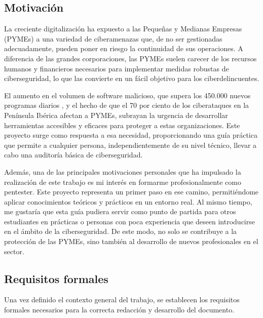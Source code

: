 \documentclass[a4paper, 10pt]{article}
\begin{document}
\subsection{Motivación}
La creciente digitalización ha expuesto a las Pequeñas y Medianas Empresas (PYMEs) a una variedad de ciberamenazas que, de no ser gestionadas adecuadamente, 
pueden poner en riesgo la continuidad de sus operaciones. A diferencia de las grandes corporaciones, las PYMEs suelen carecer de los recursos humanos y financieros 
necesarios para implementar medidas robustas de ciberseguridad, lo que las convierte en un fácil objetivo para los ciberdelincuentes.
\par\vspace{0.5cm}
El aumento en el volumen de software malicioso, que supera los 450.000 nuevos programas diarios \cite{avtest}, y el hecho de que el 70 
por ciento de los ciberataques en la Península Ibérica afectan a PYMEs, subrayan la urgencia de desarrollar herramientas accesibles y eficaces para proteger a estas organizaciones. 
Este proyecto surge como respuesta a esa necesidad, proporcionando una guía práctica que permite a cualquier persona, independientemente de su nivel técnico, llevar a cabo una auditoría 
básica de ciberseguridad.
\par\vspace{0.5cm}
Además, una de las principales motivaciones personales que ha impulsado la realización de este trabajo es mi interés en formarme profesionalmente como pentester. 
Este proyecto representa un primer paso en ese camino, permitiéndome aplicar conocimientos teóricos y prácticos en un entorno real. Al mismo tiempo, me gustaría que esta guía 
pudiera servir como punto de partida para otros estudiantes en prácticas o personas con poca experiencia que deseen introducirse en el ámbito de la ciberseguridad. 
De este modo, no solo se contribuye a la protección de las PYMEs, sino también al desarrollo de nuevos profesionales en el sector.
\par\vspace{0.5cm}


\subsection{Requisitos formales}
Una vez definido el contexto general del trabajo, se establecen los requisitos formales necesarios para la correcta redacción y desarrollo del documento.
\end{document}
